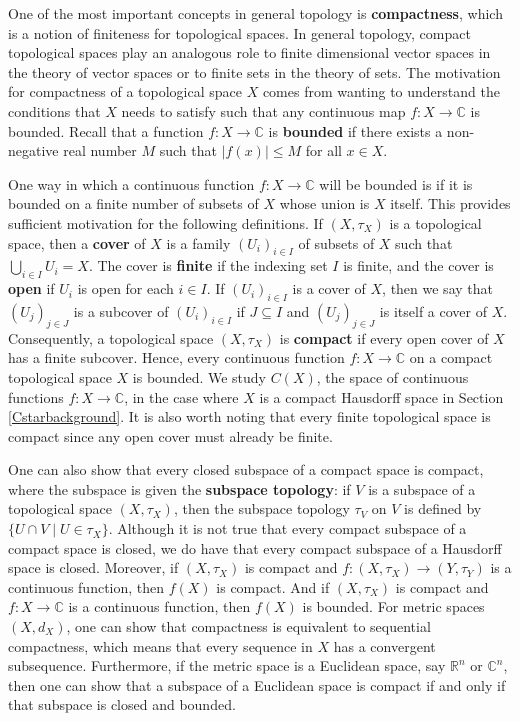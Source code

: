 \documentclass{article}
\theoremstyle{plain}
\theoremstyle{definition}
\theoremstyle{remark}
\begin{document}
One of the most important concepts in general topology is 
\textbf{compactness}, which is a notion of finiteness for topological spaces.
In general topology, compact topological spaces
play an analogous role to finite dimensional vector spaces in the theory of vector spaces
or to finite sets in the theory of sets. 
The motivation for compactness of a topological space $X$ comes from
wanting to understand the conditions that $X$ needs to satisfy such that
any 
continuous map $f : X \rightarrow \mathbb{C}$ is bounded.
Recall that a function $f : X \rightarrow \mathbb{C}$ is \textbf{bounded}
if there exists a non-negative real number $M$ such that
$\lvert f(x) \rvert \leq M$ for all $x \in X$.

One way in which a continuous function $f : X \rightarrow \mathbb{C}$ 
will be bounded is if it is bounded on a finite number of subsets of $X$
whose union is $X$ itself. 
This provides sufficient motivation for the following definitions.
If $(X, \tau_X)$ is a topological space, then a \textbf{cover} of $X$
is a family $(U_i)_{i \in I}$ of subsets of $X$ such that 
$\bigcup_{i \in I} U_i = X$.
The cover is \textbf{finite} if the indexing set $I$ is finite,
and the cover is \textbf{open} if $U_i$ is open for each $i \in I$.
If $(U_i)_{i \in I}$ is a cover of $X$, then we say that
$(U_j)_{j \in J}$ is a subcover of $(U_i)_{i \in I}$ if $J \subseteq I$
and $(U_j)_{j \in J}$ is itself a cover of $X$.
Consequently, a topological space $(X, \tau_X)$ is \textbf{compact} if every open
cover of $X$ has a finite subcover.
Hence, every continuous function $f : X \rightarrow \mathbb{C}$
on a compact topological space $X$ is bounded.
We study $C(X)$, the space of continuous functions $f : X \rightarrow \mathbb{C}$,
in the case where $X$ is a compact Hausdorff space in Section \ref{Cstarbackground}.
It is also worth noting that every finite topological space is compact 
since any open cover must already be finite.

One can also show that every closed subspace of a compact space is compact,
where the subspace is given the \textbf{subspace topology}:
if $V$ is a subspace of a topological space $(X, \tau_X)$, then the
subspace topology $\tau_V$ on $V$ is defined by 
$\{U \cap V \mid U \in \tau_X\}$.
Although it is not true that every compact subspace of a compact space is closed,
we do have that every compact subspace of a Hausdorff space is closed.
Moreover, if $(X, \tau_X)$ is compact and
$f: (X, \tau_X) \rightarrow (Y, \tau_Y)$ is a continuous function,
then $f(X)$ is compact.
And if $(X, \tau_X)$ is compact and $f: X \rightarrow \mathbb{C}$ is a continuous
function, then $f(X)$ is bounded.
For metric spaces $(X,d_X)$, one can show that 
compactness is equivalent to sequential compactness,
which means that every sequence in $X$ has a convergent subsequence.
Furthermore, if the metric space is a Euclidean space, say 
$\mathbb{R}^n$ or $\mathbb{C}^n$, then one can show that a subspace
of a Euclidean space is compact if and only if that subspace is closed and bounded.
\end{document}
